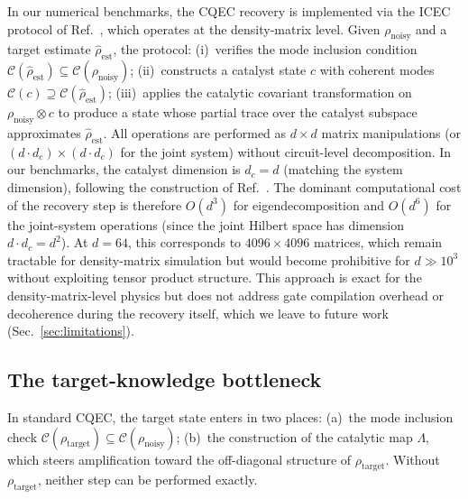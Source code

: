 \documentclass[prx,twocolumn,superscriptaddress,longbibliography,floatfix]{revtex4-2}
\newcommand{\CC}{\mathcal{C}}
\newcommand{\rhot}{\rho_\mathrm{target}}
\newcommand{\rhon}{\rho_\mathrm{noisy}}
\newcommand{\rhoe}{\hat{\rho}_\mathrm{est}}
\begin{document}
In our numerical benchmarks, the CQEC recovery is implemented via the ICEC protocol of Ref.~\cite{Wakaura2026unified}, which operates at the density-matrix level.
Given $\rhon$ and a target estimate $\rhoe$, the protocol:
(i)~verifies the mode inclusion condition $\CC(\rhoe) \subseteq \CC(\rhon)$;
(ii)~constructs a catalyst state $c$ with coherent modes $\CC(c) \supseteq \CC(\rhoe)$;
(iii)~applies the catalytic covariant transformation on $\rhon \otimes c$ to produce a state whose partial trace over the catalyst subspace approximates $\rhoe$.
All operations are performed as $d \times d$ matrix manipulations (or $(d \cdot d_c) \times (d \cdot d_c)$ for the joint system) without circuit-level decomposition.
In our benchmarks, the catalyst dimension is $d_c = d$ (matching the system dimension), following the construction of Ref.~\cite{Wakaura2026unified}.
The dominant computational cost of the recovery step is therefore $O(d^3)$ for eigendecomposition and $O(d^6)$ for the joint-system operations (since the joint Hilbert space has dimension $d \cdot d_c = d^2$).
At $d = 64$, this corresponds to $4096 \times 4096$ matrices, which remain tractable for density-matrix simulation but would become prohibitive for $d \gg 10^3$ without exploiting tensor product structure.
This approach is exact for the density-matrix-level physics but does not address gate compilation overhead or decoherence during the recovery itself, which we leave to future work (Sec.~\ref{sec:limitations}).

\subsection{The target-knowledge bottleneck}
\label{sec:bottleneck}

In standard CQEC, the target state enters in two places:
(a)~the mode inclusion check $\CC(\rhot) \subseteq \CC(\rhon)$;
(b)~the construction of the catalytic map $\Lambda$, which steers amplification toward the off-diagonal structure of $\rhot$.
Without $\rhot$, neither step can be performed exactly.
\end{document}
